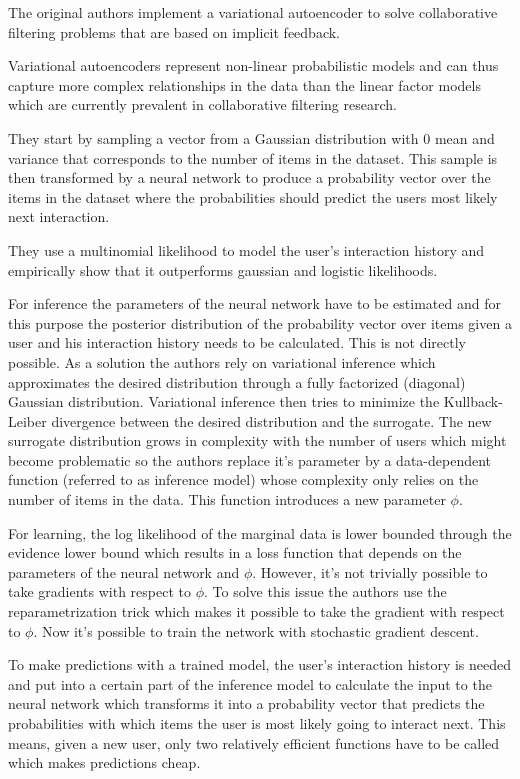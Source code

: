 The original authors implement a variational autoencoder to solve collaborative filtering problems that are based on implicit feedback.

Variational autoencoders represent non-linear probabilistic models and can thus capture more complex relationships in the data than the linear factor models which are currently prevalent in collaborative filtering research.

They start by sampling a vector from a Gaussian distribution with $0$ mean and variance that corresponds to the number of items in the dataset. This sample is then transformed by a neural network to produce a probability vector over the items in the dataset where the probabilities should predict the users most likely next interaction. 

They use a multinomial likelihood to model the user's interaction history and empirically show that it outperforms gaussian and logistic likelihoods. 

For inference the parameters of the neural network have to be estimated and for this purpose the posterior distribution of the probability vector over items given a user and his interaction history needs to be calculated. This is not directly possible. As a solution the authors rely on variational inference which approximates the desired distribution through a fully factorized (diagonal) Gaussian distribution. Variational inference then tries to minimize the Kullback-Leiber divergence between the desired distribution and the surrogate. The new surrogate distribution grows in complexity with the number of users which might become problematic so the authors replace it's parameter by a data-dependent function (referred to as inference model) whose complexity only relies on the number of items in the data. This function introduces a new parameter $\phi$.

For learning, the log likelihood of the marginal data is lower bounded through the evidence lower bound which results in a loss function that depends on the parameters of the neural network and $\phi$. However, it's not trivially possible to take gradients with respect to $\phi$. To solve this issue the authors use the reparametrization trick which makes it possible to take the gradient with respect to $\phi$. Now it's possible to train the network with stochastic gradient descent.

To make predictions with a trained model, the user's interaction history is needed and put into a certain part of the inference model to calculate the input to the neural network which transforms it into a probability vector that predicts the probabilities with which items the user is most likely going to interact next. This means, given a new user, only two relatively efficient functions have to be called which makes predictions cheap.

